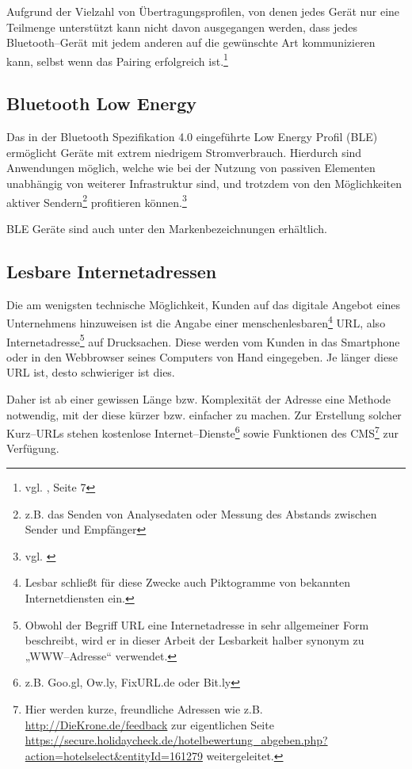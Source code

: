 Aufgrund der Vielzahl von Übertragungsprofilen, von denen jedes Gerät nur eine Teilmenge unterstützt kann nicht davon ausgegangen werden, dass jedes Bluetooth–Gerät mit jedem anderen auf die gewünschte Art kommunizieren kann, selbst wenn das Pairing erfolgreich ist.\footnote{vgl. \cite{bluetooth:spec}, Seite 7}

\subsection{Bluetooth Low Energy} %
\label{sub:bluetooth_low_energy}

Das in der Bluetooth Spezifikation 4.0 eingeführte Low Energy Profil (BLE) ermöglicht Geräte mit extrem niedrigem Stromverbrauch. Hierdurch sind Anwendungen möglich, welche wie bei der Nutzung von passiven Elementen unabhängig von weiterer Infrastruktur sind, und trotzdem von den Möglichkeiten aktiver Sendern\footnote{z.B. das Senden von Analysedaten oder Messung des Abstands zwischen Sender und Empfänger} profitieren können.\footnote{vgl. \cite{bluetooth:smart}}

BLE Geräte sind auch unter den Markenbezeichnungen  erhältlich. 

\subsection{Lesbare Internetadressen} %
\label{sub:kurzlinks}
Die am wenigsten technische Möglichkeit, Kunden auf das digitale Angebot eines Unternehmens hinzuweisen ist die Angabe einer menschenlesbaren\footnote{Lesbar schließt für diese Zwecke auch Piktogramme von bekannten Internetdiensten ein.} \ac{URL}, also Internetadresse\footnote{Obwohl der Begriff URL eine Internetadresse in sehr allgemeiner Form beschreibt, wird er in dieser Arbeit der Lesbarkeit halber synonym zu „WWW–Adresse“ verwendet.} auf Drucksachen. Diese werden vom Kunden in das Smartphone oder in den Webbrowser seines Computers von Hand eingegeben. Je länger diese URL ist, desto schwieriger ist dies.

Daher ist ab einer gewissen Länge bzw. Komplexität der Adresse eine Methode notwendig, mit der diese kürzer bzw. einfacher zu machen. Zur Erstellung solcher Kurz–URLs stehen kostenlose Internet–Dienste\footnote{z.B. Goo.gl, Ow.ly, FixURL.de oder Bit.ly} sowie Funktionen des \ac{CMS}\footnote{Hier werden kurze, freundliche Adressen wie z.B. \url{http://DieKrone.de/feedback} zur eigentlichen Seite \url{https://secure.holidaycheck.de/hotelbewertung_abgeben.php?action=hotelselect&entityId=161279} weitergeleitet.} zur Verfügung. 

